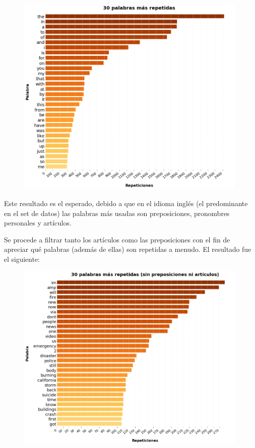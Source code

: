 \documentclass[titlepage,a4paper]{article}
\begin{document}
    \begin{figure}[H]
    \centering
    \includegraphics[width=1\textwidth]{graficos/Analisis Lexico Grafico/top30MasUsadas.png}
    \caption{}  
    \end{figure}
    
    
    Este resultado es el esperado, debido a que en el idioma inglés (el predominante en el set de datos) las palabras más usadas son preposiciones, pronombres personales y artículos.
    
    Se procede a filtrar tanto los artículos como las preposiciones  con el fin de apreciar qué palabras (además de ellas) son repetidas a menudo. El resultado fue el siguiente:

    \begin{figure}[H]
    \centering
    \includegraphics[width=1\textwidth]{graficos/Analisis Lexico Grafico/30masRepetidasFiltrado.png}
    \caption{}  
    \end{figure}
    
\end{document}
